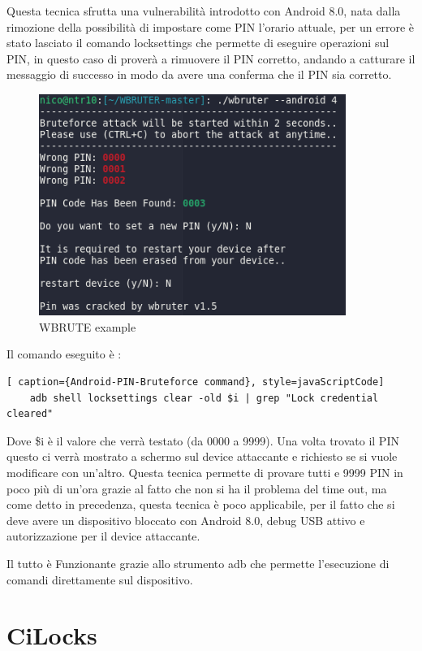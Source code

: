 Questa tecnica sfrutta una vulnerabilità introdotto con Android 8.0, nata dalla rimozione della possibilità di impostare come PIN l’orario attuale, per un errore è stato lasciato il comando locksettings che permette di eseguire operazioni sul PIN, in questo caso di proverà a rimuovere il PIN corretto, andando a catturare il messaggio di successo in modo da avere una conferma che il PIN sia corretto.

\begin{figure}[h!]
	\centering
	\includegraphics[width=100mm]{Immagini/3/wbrute.png}
	\caption{WBRUTE example}
    \label{fig:WBRUTE_example}
\end{figure}

Il comando eseguito è :

\begin{lstlisting}[ caption={Android-PIN-Bruteforce command}, style=javaScriptCode]
	adb shell locksettings clear -old $i | grep "Lock credential cleared"
\end{lstlisting}

Dove \$i è il valore che verrà testato (da 0000 a 9999). Una volta trovato il PIN questo ci verrà mostrato a schermo sul device attaccante e richiesto se si vuole modificare con un’altro. Questa tecnica permette di provare tutti e 9999 PIN in poco più di un’ora grazie al fatto che non si ha il problema del time out, ma come detto in precedenza, questa tecnica è poco applicabile, per il fatto che si deve avere un dispositivo bloccato con Android 8.0, debug USB attivo e autorizzazione per il device attaccante.

Il tutto è Funzionante grazie allo strumento adb\cite{adb} che permette l’esecuzione di comandi direttamente sul dispositivo.


\section{CiLocks}

